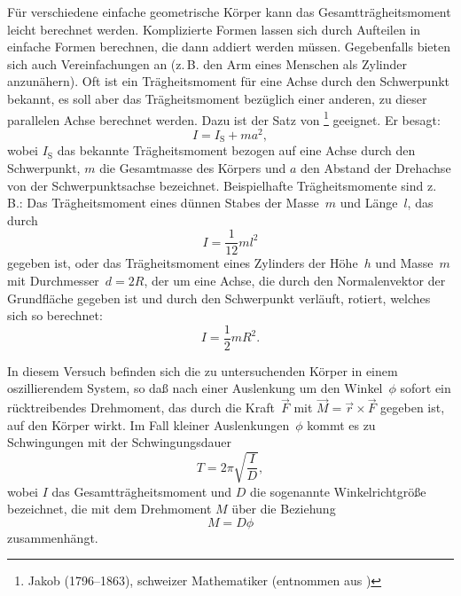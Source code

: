 Für verschiedene einfache geometrische Körper kann das
Gesamtträgheitsmoment leicht berechnet werden.  Komplizierte Formen
lassen sich durch Aufteilen in einfache Formen berechnen, die dann
addiert werden müssen.  Gegebenfalls bieten sich auch Vereinfachungen an
(z.\,B. den Arm eines Menschen als Zylinder anzunähern).  Oft ist ein
Trägheitsmoment für eine Achse durch den Schwerpunkt bekannt, es soll
aber das Trägheitsmoment bezüglich einer anderen, zu dieser parallelen
Achse berechnet werden. Dazu ist der Satz von
\footnote{Jakob  (1796--1863), schweizer
  Mathematiker (entnommen aus \textcite{wikipedia:jakob-steiner})}
geeignet.  Er besagt:
\begin{equation}
  \label{eq:steiner}
  I = I_\text{S} + m a^2,
\end{equation}
wobei $I_\text{S}$ das bekannte Trägheitsmoment bezogen auf eine Achse
durch den Schwerpunkt, $m$ die Gesamtmasse des Körpers und $a$ den
Abstand der Drehachse von der Schwerpunktsachse bezeichnet.
Beispielhafte Trägheitsmomente sind z.\,B.:  Das Trägheitsmoment eines
dünnen Stabes der Masse~$m$ und Länge~$l$, das durch
\begin{equation}
  \label{eq:traegheit-duenner-stab}
  I = \frac{1}{12} m l^2
\end{equation}
gegeben ist, oder das Trägheitsmoment eines Zylinders der Höhe~$h$ und
Masse~$m$ mit Durchmesser~$d = 2R$, der um eine Achse, die durch den
Normalenvektor der Grundfläche gegeben ist und durch den Schwerpunkt
verläuft, rotiert, welches sich so berechnet:
\begin{equation}
  \label{eq:traegheit-zylinder-stehend}
  I = \frac{1}{2} m R^2.
\end{equation}

In diesem Versuch befinden sich die zu untersuchenden Körper in einem
oszillierendem System, so daß nach einer Auslenkung um den Winkel~$\phi$
sofort ein rücktreibendes Drehmoment, das durch die Kraft~$\vec{F}$ mit
$\vec{M} = \vec{r} \times \vec{F}$ gegeben ist, auf den Körper wirkt.
Im Fall kleiner Auslenkungen~$\phi$ kommt es zu Schwingungen mit der
Schwingungsdauer
\begin{equation}
  \label{eq:periode}
  T = 2 \pi \sqrt{\frac{I}{D}},
\end{equation}
wobei $I$ das Gesamtträgheitsmoment und $D$ die sogenannte
Winkelrichtgröße bezeichnet, die mit dem Drehmoment $M$ über die
Beziehung
\begin{equation}
  \label{eq:drehmoment-winkelricht}
  M = D \phi
\end{equation}
zusammenhängt.

